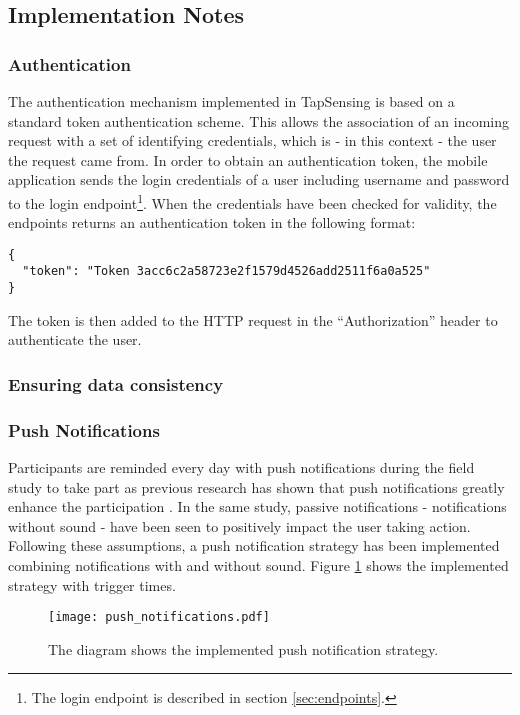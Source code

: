 \subsection{Implementation Notes}
\subsubsection{Authentication}
The authentication mechanism implemented in TapSensing is based on a standard token authentication scheme. This allows the association of an incoming request with a set of identifying credentials, which is - in this context - the user the request came from. In order to obtain an authentication token, the mobile application sends the login credentials of a user including username and password to the login endpoint\footnote{The login endpoint is described in section \ref{sec:endpoints}.}. When the credentials have been checked for validity, the endpoints returns an authentication token in the following format:
\begin{verbatim}
{     
  "token": "Token 3acc6c2a58723e2f1579d4526add2511f6a0a525"
}
\end{verbatim}
The token is then added to the HTTP request in the ``Authorization'' header to authenticate the user.
\subsubsection{Ensuring data consistency}



\subsubsection{Push Notifications}
Participants are reminded every day with push notifications during the field study to take part as previous research has shown that push notifications greatly enhance the participation \cite{pushNot}. In the same study\cite{pushNot}, passive notifications - notifications without sound - have been seen to positively impact the user taking action. Following these assumptions, a push notification strategy has been implemented combining notifications with and without sound. Figure \ref{fig:push-notifications} shows the implemented strategy with trigger times. \\

\begin{figure}[h!]
  \centering
  \texttt{[image: push\_notifications.pdf]}
  \caption{The diagram shows the implemented push notification strategy.} \label{fig:push-notifications}
\end{figure}

